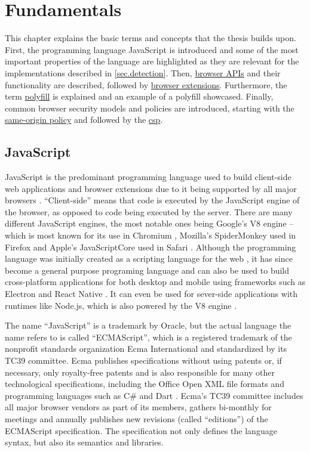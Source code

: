 \chapter{Fundamentals}
\label{sec.fundamentals}

This chapter explains the basic terms and concepts that the thesis builds upon.
First, the programming language JavaScript is introduced and some of the most important properties of the language are highlighted as they are relevant for the implementations described in \autoref{sec.detection}.
Then, \hyperref[sec.browserAPIs]{browser APIs} and their functionality are described, followed by \hyperref[sec.browserExtensions]{browser extensions}.
Furthermore, the term \hyperref[sec.polyfill]{polyfill} is explained and an example of a polyfill showcased.
Finally, common browser security models and policies are introduced, starting with the \hyperref[sec.origin]{same-origin policy} and followed by the \hyperref[sec.csp]{\acf{csp}}.



\section{JavaScript}
\label{sec.javascript}

JavaScript is the predominant programming language used to build client-side web applications and browser extensions due to it being supported by all major browsers \cite{MozBrowserExtensionAPIs}. “Client-side” means that code is executed by the JavaScript engine of the browser, as opposed to code being executed by the server. There are many different JavaScript engines, the most notable ones being Google's V8 engine – which is most known for its use in Chromium \cite{V8}, Mozilla's SpiderMonkey used in Firefox \cite{SpiderMonkey} and Apple's JavaScriptCore used in Safari \cite{JavaScriptCore}.
Although the programming language was initially created as a scripting language for the web \cite{ECMA262_edition1}, it has since become a general purpose programing language and can also be used to build cross-platform applications for both desktop and mobile using frameworks such as Electron \cite{Electron} and React Native \cite{ReactNative}. It can even be used for sever-side applications with runtimes like Node.js, which is also powered by the V8 engine \cite{NodeJS}.

The name “JavaScript” is a trademark by Oracle, but the actual language the name refers to is called “ECMAScript”, which is a registered trademark of the nonprofit standards organization Ecma International and standardized by its TC39 committee. Ecma publishes specifications without using patents or, if necessary, only royalty-free patents and is also responsible for many other technological specifications, including the Office Open XML file formats and programming languages such as C\# and Dart \cite{EcmaStandards}. Ecma's TC39 committee includes all major browser vendors as part of its members, gathers bi-monthly for meetings and annually publishes new revisions (called “editions”) of the ECMAScript specification. The specification not only defines the language syntax, but also its semantics and libraries. \cite{TC39_general, TC39_activities}

